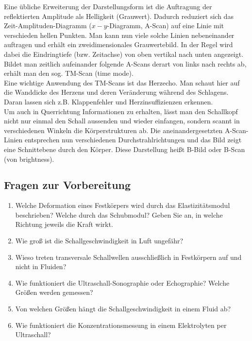 \noindent
Eine übliche Erweiterung der Darstellungsform ist die Auftragung der reflektierten Amplitude als Helligkeit (Grauwert). Dadurch reduziert sich das Zeit-Amplituden-Diagramm ($x-y$-Diagramm, A-Scan) auf eine Linie mit verschieden hellen Punkten. Man kann nun viele solche Linien nebeneinander auftragen und erhält ein zweidimensionales Grauwertebild. In der Regel wird dabei die Eindringtiefe (bzw. Zeitachse) von oben vertikal nach unten angezeigt. Bildet man zeitlich aufeinander folgende A-Scans derart von links nach rechts ab, erhält man den sog. TM-Scan
(time mode).\\
Eine wichtige Anwendung des TM-Scans ist das Herzecho. Man schaut hier auf die Wanddicke des Herzens und deren Veränderung während des Schlagens. Daran lassen sich z.B. Klappenfehler und Herzinsuffizienzen erkennen.\\

\noindent
Um auch in Querrichtung Informationen zu erhalten, lässt man den Schallkopf nicht nur einmal den Schall aussenden und wieder einfangen, sondern scannt in verschiedenen Winkeln die Körperstrukturen ab. Die aneinandergesetzten A-Scan-Linien entsprechen nun verschiedenen Durchstrahlrichtungen und das Bild zeigt eine Schnittebene durch den Körper. Diese Darstellung heißt B-Bild oder B-Scan (von
brightness).

\begin{tutorhint}
\section{Fragen zur Vorbereitung}

\begin{enumerate} 
	\item Welche Deformation eines Festkörpers wird durch das Elastizitätsmodul beschrieben? Welche durch das Schubmodul? Geben Sie an, in welche Richtung jeweils die Kraft wirkt.
	\item Wie groß ist die Schallgeschwindigkeit in Luft ungefähr?
	\item Wieso treten transversale Schallwellen ausschließlich in Festkörpern auf und nicht in Fluiden?
	\item Wie funktioniert die Ultraschall-Sonographie oder Echographie? Welche Größen werden gemessen?
	\item Von welchen Größen hängt die Schallgeschwindigkeit in einem Fluid ab?
	\item Wie funktioniert die Konzentrationsmessung in einem Elektrolyten per Ultraschall? 
\end{enumerate} 
\end{tutorhint}

